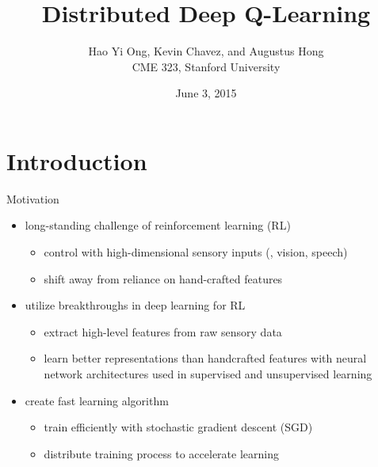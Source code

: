 



\title{\large \bfseries Distributed Deep Q-Learning}

\author{Hao Yi Ong, Kevin Chavez, and Augustus Hong\\[3ex]
CME 323, Stanford University}

\date{June 3, 2015}



\frame{
\thispagestyle{empty}
\titlepage
}

\section{Introduction}

\begin{frame}{Motivation}
  \begin{itemize}\itemsep=12pt
  
    \item long-standing challenge of reinforcement learning (RL)
    \vspace*{0.5em}
    \begin{itemize}
        \item control with high-dimensional sensory inputs (\eg, vision, speech)
        \item shift away from reliance on hand-crafted features
    \end{itemize}
    
    \item utilize breakthroughs in deep learning for RL \cite{M+:13,M+:15}
    \vspace*{0.5em}
    \begin{itemize}
        \item extract high-level features from raw sensory data
        \item learn better representations than handcrafted features with neural network architectures used in supervised and unsupervised learning
    \end{itemize}

    \item create fast learning algorithm
    \vspace*{0.5em}
    \begin{itemize}
        \item train efficiently with stochastic gradient descent (SGD)
        \item distribute training process to accelerate learning \cite{D+:12}
    \end{itemize}

  \end{itemize}
\end{frame}

